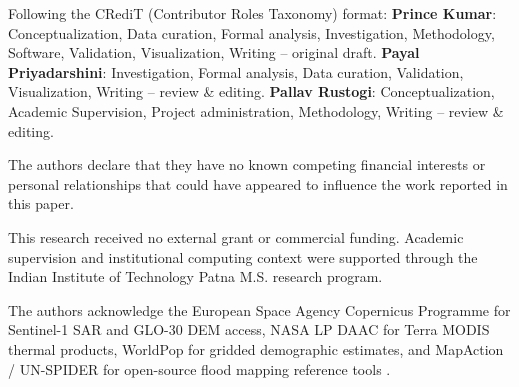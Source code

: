 \documentclass[OA,linenum]{InterPore}
\begin{document}
\begin{bmsec}
Following the CRediT (Contributor Roles Taxonomy) format:
\textbf{Prince Kumar}: Conceptualization, Data curation, Formal analysis, Investigation, Methodology, Software, Validation, Visualization, Writing -- original draft.
\textbf{Payal Priyadarshini}: Investigation, Formal analysis, Data curation, Validation, Visualization, Writing -- review \& editing.
\textbf{Pallav Rustogi}: Conceptualization, Academic Supervision, Project administration, Methodology, Writing -- review \& editing.
\end{bmsec}

\begin{bmsec}
The authors declare that they have no known competing financial interests or personal relationships that could have appeared to influence the work reported in this paper.
\end{bmsec}

\begin{bmsec}
This research received no external grant or commercial funding. Academic supervision and institutional computing context were supported through the Indian Institute of Technology Patna M.S. research program.
\end{bmsec}

\begin{ack}
The authors acknowledge the European Space Agency Copernicus Programme for Sentinel-1 SAR and GLO-30 DEM access, NASA LP DAAC for Terra MODIS thermal products, WorldPop for gridded demographic estimates, and MapAction / UN-SPIDER for open-source flood mapping reference tools \cite{MapAction2024}.
\end{ack}




\end{document}
